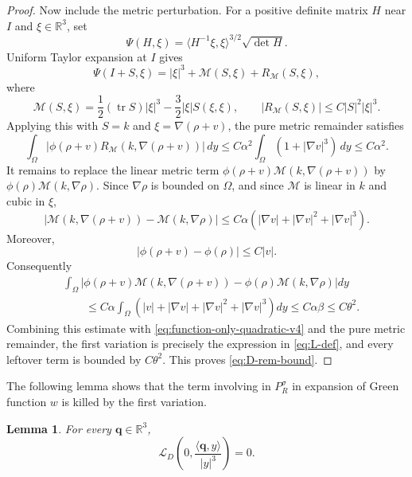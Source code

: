 \documentclass[11pt]{amsart}
\numberwithin{equation}{section}
\newtheorem{lemma}[theorem]{Lemma}
\theoremstyle{definition}
\newcommand{\R}{\mathbb R}
\newcommand{\tr}{\operatorname{tr}}
\newcommand{\rhoE}{\rho}
\newcommand{\LD}{\mathcal L_D}
\newcommand{\ip}[2]{\langle #1,#2\rangle}
\newcommand{\abs}[1]{\left\lvert #1\right\rvert}
\begin{document}
\begin{proof}
Now include the metric perturbation.  For a positive definite matrix $H$ near $I$ and $\xi\in\R^3$, set
$$
        \Psi(H,\xi)=\ip{H^{-1}\xi}{\xi}^{3/2}\sqrt{\det H}.
$$
Uniform Taylor expansion at $I$ gives
\begin{equation}\label{eq:Psi-Taylor-v4}
        \Psi(I+S,\xi)=|\xi|^3+\mathcal M(S,\xi)+R_{\mathcal M}(S,\xi),
\end{equation}
where
$$
        \mathcal M(S,\xi)=\frac12(\tr S)|\xi|^3
        -\frac32|\xi|S(\xi,\xi),
        \qquad
        |R_{\mathcal M}(S,\xi)|\le C|S|^2|\xi|^3.
$$
Applying this with $S=k$ and $\xi=\nabla(\rhoE+v)$, the pure metric remainder satisfies
$$
        \int_\Omega |\phi(\rhoE+v)R_{\mathcal M}(k,\nabla(\rhoE+v))|\,dy
        \le C\alpha^2\int_\Omega (1+|\nabla v|^3)\,dy
        \le C\alpha^2.
$$
It remains to replace the linear metric term
$\phi(\rhoE+v)\mathcal M(k,\nabla(\rhoE+v))$ by
$\phi(\rhoE)\mathcal M(k,\nabla\rhoE)$.  Since $\nabla\rhoE$ is bounded on $\Omega$, and since $\mathcal M$ is linear in $k$ and cubic in $\xi$,
\begin{equation}\label{eq:M-Lipschitz-v4}
        |\mathcal M(k,\nabla(\rhoE+v))-\mathcal M(k,\nabla\rhoE)|
        \le C\alpha(|\nabla v|+|\nabla v|^2+|\nabla v|^3).
\end{equation}
Moreover,
$$
        |\phi(\rhoE+v)-\phi(\rhoE)|\le C|v|.
$$
Consequently
$$
\begin{aligned}
        &\int_\Omega \left|
        \phi(\rhoE+v)\mathcal M(k,\nabla(\rhoE+v))
        -\phi(\rhoE)\mathcal M(k,\nabla\rhoE)
        \right|dy                                                \\
        &\qquad \le C\alpha\int_\Omega
        (|v|+|\nabla v|+|\nabla v|^2+|\nabla v|^3)dy
        \le C\alpha\beta\le C\theta^2.
\end{aligned}
$$
Combining this estimate with \eqref{eq:function-only-quadratic-v4} and the pure metric remainder, the first variation is precisely the expression in \eqref{eq:L-def}, and every leftover term is bounded by $C\theta^2$.  This proves \eqref{eq:D-rem-bound}.
\end{proof}

The following lemma shows that the term involving in $P_R^\sigma$ in expansion  of Green function $w$ is killed by the first variation.
\begin{lemma}\label{lem:dipole-kernel}
For every $\mathbf q\in\R^3$,
\begin{equation}\label{eq:dipole-kernel}
        \LD\left(0,\frac{\ip{\mathbf q}{y}}{\abs y^3}\right)=0.
\end{equation}
\end{lemma}
\end{document}
